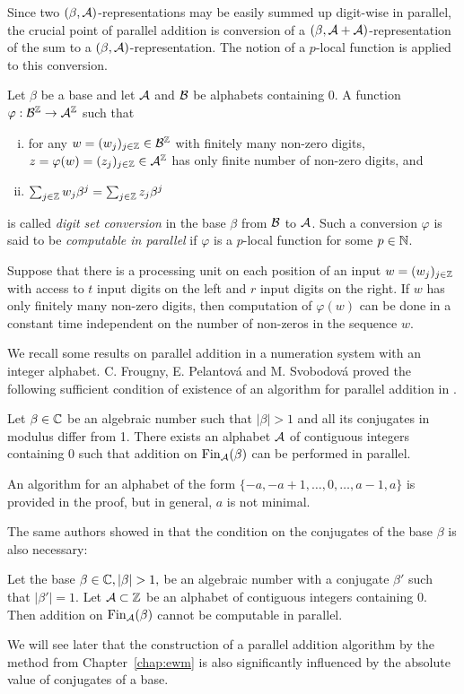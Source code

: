   
Since two $(\beta,\mathcal{A})$-representations may be easily summed up digit-wise in parallel, the crucial point of parallel addition is conversion of a $(\beta,\mathcal{A}+\mathcal{A})$-representation of the sum to a $(\beta,\mathcal{A})$-representation. The notion of a $p$-local function is applied to this conversion.
\begin{defn}
\label{def:digitSetConversion}
Let $\beta$ be a base and let $\mathcal{A}$ and $\mathcal{B}$ be alphabets containing 0. A function $\varphi:\mathcal{B}^{\mathbb{Z}}\rightarrow \mathcal{A}^{\mathbb{Z}}$ such that
  \begin{enumerate}[i)]
      \item for any $w=(w_j)_{j\in\mathbb{Z}}\in\mathcal{B}^{\mathbb{Z}}$ with finitely many non-zero digits, $z=\varphi(w)=(z_j)_{j\in\mathbb{Z}}\in\mathcal{A}^{\mathbb{Z}}$ has only finite number of non-zero digits, and
      \item $\sum_{j\in\mathbb{Z}} w_j \beta^j= \sum_{j\in\mathbb{Z}} z_j \beta^j$
  \end{enumerate}
  is called \emph{digit set conversion} in the base $\beta$ from $\mathcal{B}$ to $\mathcal{A}$. Such a conversion $\varphi$ is said to be \emph{computable in parallel} if $\varphi$ is a $p$-local function for some $p\in\mathbb{N}$. 
\end{defn}

Suppose that there is a processing unit on  each position of an input $w=(w_j)_{j\in\mathbb{Z}}$ with access to $t$ input digits on the left and $r$ input digits on the right. If $w$ has only finitely many non-zero digits, then computation of $\varphi(w)$ can be done in a constant time independent on the number of non-zeros in the sequence $w$.

We recall some results on parallel addition in a numeration system with an integer alphabet. C. Frougny, E. Pelantov\'a and M. Svobodov\'a proved  the following sufficient condition of existence of an algorithm for parallel addition in \cite{parAddNS}.
  \begin{thm}
  \label{thm:suffConjugates}
  Let $\beta\in\mathbb{C}$ be an algebraic number such that $|\beta|>1$ and all its conjugates in modulus differ from 1. There exists an alphabet $\mathcal{A}$ of contiguous integers containing 0 such that addition on $\text{Fin}_{\mathcal{A}}(\beta)$ can be performed in parallel.
  \end{thm}
An algorithm for an alphabet of the form $\{-a,-a+1, \dots,0,\dots,a-1,a\}$ is provided in the proof, but in general, $a$ is not minimal.
    
The same authors showed in \cite{kBlock} that the condition on the conjugates of the base $\beta$ is also necessary:
  \begin{thm}
  Let the base $\beta\in\CC, |\beta|>1,$ be an algebraic number with a conjugate $\beta'$ such that $|\beta'|=1$. Let $\mathcal{A}\subset\mathbb{Z}$ be an alphabet of contiguous integers containing 0. Then addition on $\text{Fin}_{\mathcal{A}}(\beta)$ cannot be computable in parallel.
  \end{thm}
We will see later that the construction of a parallel addition algorithm by the method from Chapter~\ref{chap:ewm} is also significantly influenced by the absolute value of conjugates of a base.
  
